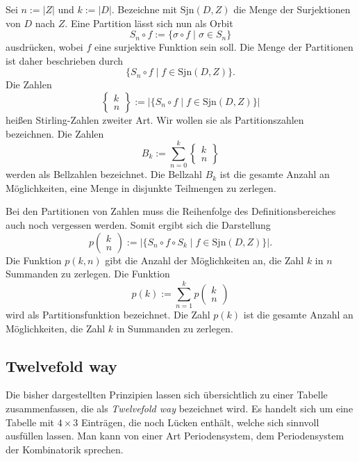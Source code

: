 \documentclass[a4paper,12pt,fleqn]{article}
\begin{document}
Sei $n:=|Z|$ und $k:=|D|$. Bezeichne mit $\mathrm{Sjn}(D,Z)$
die Menge der Surjektionen von $D$ nach $Z$. Eine Partition
lässt sich nun als Orbit
\begin{equation}
S_n\circ f := \{\sigma\circ f\;|\;\sigma\in S_n\}
\end{equation}
ausdrücken, wobei $f$ eine surjektive Funktion sein soll. 
Die Menge der Partitionen ist daher beschrieben durch
\begin{equation}
\{S_n\circ f\;|\;f\in\mathrm{Sjn}(D,Z)\}.
\end{equation}
Die Zahlen
\begin{equation}
\begin{Bmatrix}
k\\ n
\end{Bmatrix}
:=|\{S_n\circ f\;|\;f\in\mathrm{Sjn}(D,Z)\}|
\end{equation}
heißen Stirling-Zahlen zweiter Art. Wir wollen sie
als Partitionszahlen bezeichnen. Die Zahlen
\begin{equation}
B_k:=\sum_{n=0}^k \begin{Bmatrix}
k\\ n
\end{Bmatrix}
\end{equation}
werden als Bellzahlen bezeichnet. Die Bellzahl $B_k$ ist
die gesamte Anzahl an Möglichkeiten, eine Menge in disjunkte
Teilmengen zu zerlegen. 

Bei den Partitionen von Zahlen muss die Reihenfolge des
Definitionsbereiches auch noch vergessen werden. Somit ergibt
sich die Darstellung
\begin{equation}
p\begin{pmatrix}k\\ n\end{pmatrix}
:=|\{S_n\circ f\circ S_k\;|\; f\in\mathrm{Sjn}(D,Z)\}|.
\end{equation}
Die Funktion $p(k,n)$ gibt die Anzahl der Möglichkeiten an, die
Zahl $k$ in $n$ Summanden zu zerlegen. Die Funktion
\begin{equation}
p(k) := \sum_{n=1}^k p\begin{pmatrix}
k\\ n
\end{pmatrix}
\end{equation}
wird als Partitionsfunktion bezeichnet. Die Zahl $p(k)$ ist
die gesamte Anzahl an Möglichkeiten, die Zahl $k$ in Summanden
zu zerlegen.

\subsection{Twelvefold way}
Die bisher dargestellten Prinzipien lassen sich übersichtlich
zu einer Tabelle zusammenfassen, die als \textit{Twelvefold way}
bezeichnet wird. Es handelt sich um eine Tabelle mit $4\times 3$
Einträgen, die noch Lücken enthält, welche sich sinnvoll ausfüllen
lassen. Man kann von einer Art Periodensystem, dem Periodensystem
der Kombinatorik sprechen.
\end{document}
